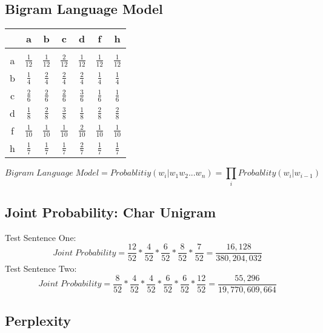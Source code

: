 \documentclass{article}
\begin{document}
\subsection{Bigram Language Model}
\begin{center}
\begin{tabular}{c|| c c c c c c} 
\hline\hline
	&	a&		b&			c&			d&			f&			h \\
\hline\hline
\\
a	&\(\frac{1}{12}\)	&\(\frac{1}{12}\)	&\(\frac{2}{12}\)	&\(\frac{1}{12}\)	&\(\frac{1}{12}\)	&\(\frac{1}{12}\) \\ [2ex]
b	&\(\frac{1}{4}\)	&\(\frac{2}{4}\)	&\(\frac{2}{4}\)	&\(\frac{2}{4}\)	&\(\frac{1}{4}\)	&\(\frac{1}{4}\) \\ [2ex]
c	&\(\frac{2}{6}\)	&\(\frac{2}{6}\)	&\(\frac{2}{6}\)	&\(\frac{3}{6}\)	&\(\frac{1}{6}\)	&\(\frac{1}{6}\) \\ [2ex]
d	&\(\frac{1}{8}\)	&\(\frac{2}{8}\)	&\(\frac{3}{8}\)	&\(\frac{1}{8}\)	&\(\frac{2}{8}\)	&\(\frac{2}{8}\) \\ [2ex]
f	&\(\frac{1}{10}\)	&\(\frac{1}{10}\)	&\(\frac{1}{10}\)	&\(\frac{2}{10}\)	&\(\frac{1}{10}\)	&\(\frac{1}{10}\) \\ [2ex]
h	&\(\frac{1}{7}\)	&\(\frac{1}{7}\)	&\(\frac{1}{7}\)	&\(\frac{2}{7}\)	&\(\frac{1}{7}\)	&\(\frac{1}{7}\) \\ [2ex]
\hline
\end{tabular}
\end{center}
\begin{equation}
	Bigram\;Language\;Model = Probablitiy(w_i|w_1w_2...w_n) = \underset{i}{\prod} Probablity(w_i|w_{i-1})
\end{equation}

\subsection{Joint Probability: Char Unigram} 
Test Sentence One: 
\begin{equation}
	Joint\;Probability = \frac{12}{52}*\frac{4}{52}*\frac{6}{52}*\frac{8}{52}*\frac{7}{52} = \frac{16,128}{380,204,032} \label{Test Case One}
\end{equation}
Test Sentence Two: 
\begin{equation}
	Joint\;Probability = \frac{8}{52}*\frac{4}{52}*\frac{4}{52}*\frac{6}{52}*\frac{6}{52}*\frac{12}{52} = \frac{55,296}{19,770,609,664} \label{Test Case One}
\end{equation}
\subsection{Perplexity}
\end{document}
